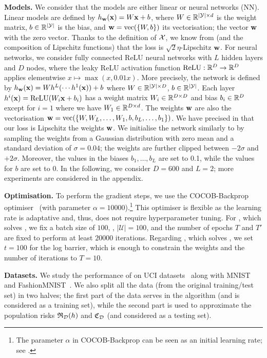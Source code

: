 \textbf{Models.} 
We consider that the models are either linear or neural networks (NN).
Linear models are defined by $h_{\mathbf{w}}(\mathbf{x})=W\mathbf{x}+b$, where $W\in\mathbb{R}^{|\mathcal{Y}|\times d}$ is the weight matrix, $b\in\mathbb{R}^{|\mathcal{Y}|}$ is the bias, and $\mathbf{w}=\operatorname*{\mathrm{vec}}(\{W, b\})$ its vectorisation; the vector $\mathbf{w}$ with the zero vector.
Thanks to the definition of $\mathcal{X}$, we know from  (and the composition of Lipschitz functions) that the loss is $\sqrt{2}\eta$-Lipschitz \wrt $\mathbf{w}$.
For neural networks, we consider fully connected ReLU neural networks with $L$ hidden layers and $D$ nodes, where the leaky ReLU activation function $\operatorname*{\mathrm{ReLU}}: \mathbb{R}^D\to\mathbb{R}^D$ applies elementwise $x\mapsto \max(x, 0.01x)$.
More precisely, the network is defined by $h_{\mathbf{w}}(\mathbf{x}) = Wh^{L}(\cdots h^{1}(\mathbf{x}))+b$ where $W\in \mathbb{R}^{|\mathcal{Y}|\times D}$, $b\in\mathbb{R}^{|\mathcal{Y}|}$. Each layer $h^{i}(\mathbf{x})=\operatorname*{\mathrm{ReLU}}(W_i\mathbf{x}+b_i)$ has a weight matrix $W_i\in \mathbb{R}^{D\times D}$ and bias $b_i\in \mathbb{R}^{D}$ except for $i=1$ where we have $W_1\in \mathbb{R}^{D\times d}$. 
The weights $\mathbf{w}$ are also the vectorisation $\mathbf{w}=\operatorname*{\mathrm{vec}}(\{W, W_{L}, \dots, W_1, b, b_{L}, \dots, b_1\})$. 
We have precised in  that our loss is Lipschitz \wrt the weights $\mathbf{w}$.
We initialise the network similarly to \cite{dziugaite2017computing} by sampling the weights from a Gaussian distribution with zero mean and a standard deviation of $\sigma=0.04$; the weights are further clipped between $-2\sigma$ and $+2\sigma$.
Moreover, the values in the biases $b_1,\dots, b_L$ are set to 0.1, while the values for $b$ are set to $0$.
In the following, we consider $D=600$ and $L=2$; more experiments are considered in the appendix.

\textbf{Optimisation.} 
To perform the gradient steps, we use the COCOB-Backprop optimiser~\cite{orabona2017training} (with parameter $\alpha=10000$).\footnote{The parameter $\alpha$ in COCOB-Backprop can be seen as an initial learning rate; see \cite{orabona2017training}.}
This optimiser is flexible as the learning rate is adaptative and, thus, does not require hyperparameter tuning.
For , which solves , we fix a batch size of $100$, \ie, $|\mathcal{U}|=100$, and the number of epochs $T$ and $T'$ are fixed to perform at least $20000$ iterations.
Regarding , which solves , we set $t=100$ for the log barrier, which is enough to constrain the weights and the number of iterations to $T=10$.

\textbf{Datasets.} 
We study the performance of  on UCI datasets~\citep{dua2017uci} along with MNIST~\citep{lecun1998mnist} and FashionMNIST~\citep{xiao2017fashion}.
We also split all the data (from the original training/test set) in two halves; the first part of the data serves in the algorithm (and is considered as a training set), while the second part is used to approximate the population risks $\mathfrak{R}_{\mathcal{D}}(h)$ and $\mathfrak{C}_{\mathcal{D}}$ (and considered as a testing set).

